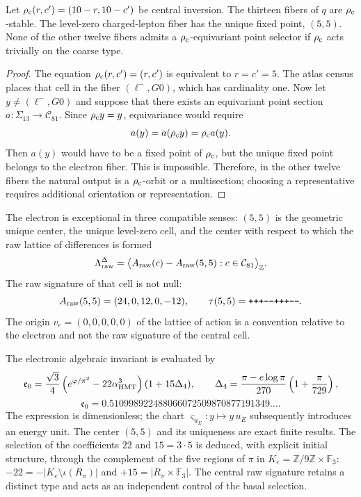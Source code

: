 \begin{theorem}
Let \(\rho_{\rm c}(r,c')=(10-r,10-c')\) be central inversion. The thirteen fibers of
\(q\) are \(\rho_{\rm c}\)-stable. The level-zero charged-lepton fiber has
the unique fixed point, \((5,5)\). None of the other twelve fibers admits
a \(\rho_{\rm c}\)-equivariant point selector if \(\rho_{\rm c}\) acts trivially
on the coarse type.
\end{theorem}
\begin{proof}
The equation \(\rho_{\rm c}(r,c')=(r,c')\) is equivalent to \(r=c'=5\). The atlas census
places that cell in the fiber \((\ell^-,G0)\), which has cardinality one. Now let
\(y\neq(\ell^-,G0)\) and suppose that there exists an equivariant point section
\(a:\Sigma_{13}\to\mathcal C_{81}\). Since \(\rho_{\rm c} y=y\),
equivariance would require
\[
 a(y)=a(\rho_{\rm c} y)=\rho_{\rm c} a(y).
\]
Then \(a(y)\) would have to be a fixed point of \(\rho_{\rm c}\), but the unique fixed point belongs to the electron fiber. This is impossible. Therefore, in the other twelve fibers the natural output is a \(\rho_{\rm c}\)-orbit or a multisection; choosing a representative requires additional orientation or representation.
\end{proof}

The electron is exceptional in three compatible senses: \((5,5)\) is the
geometric unique center, the unique level-zero cell, and the center with respect
to which the raw lattice of differences is formed
\[
 \Lambda_{\rm raw}^{\Delta}
 =\bigl\langle A_{\rm raw}(c)-A_{\rm raw}(5,5):
 c\in\mathcal C_{81}\bigr\rangle_{\mathbb Z}.
\]
The raw signature of that cell is not null:
\[
 A_{\rm raw}(5,5)=(24,0,12,0,-12),
 \qquad \tau(5,5)=\texttt{+++---+++---}.
\]
The origin \(v_e=(0,0,0,0,0)\) of the lattice of action is a convention
relative to the electron and not the raw signature of the central cell.

The electronic algebraic invariant is evaluated by
\[
 \mathfrak e_0=
 \frac{\sqrt3}{4}
 \left(e^{\varphi/\pi^2}-22\alpha_{\rm HMT}^{3}\right)
 (1+15\Delta_4),
 \qquad
 \Delta_4=
 \frac{\pi-e\log\pi}{270}\left(1+\frac{\pi}{729}\right),
\]
\[
 \mathfrak e_0
 =0.510998922488066072509870877191349\ldots.
\]
The expression is dimensionless; the chart
\(\varsigma_{u_E}:y\mapsto y\,u_E\) subsequently introduces an energy unit.
The center \((5,5)\) and its uniqueness are exact finite results. The selection
of the coefficients \(22\) and \(15=3\cdot5\) is deduced, with explicit initial
structure, through the complement
of the five regions of \(\pi\) in \(K_e=\mathbb Z/9\mathbb Z\times\mathbb F_3\):
\(-22=-|K_e\setminus\iota(R_\pi)|\) and
\(+15=|R_\pi\times\mathbb F_3|\). The central raw signature retains a distinct type
and acts as an independent control of the basal selection.

